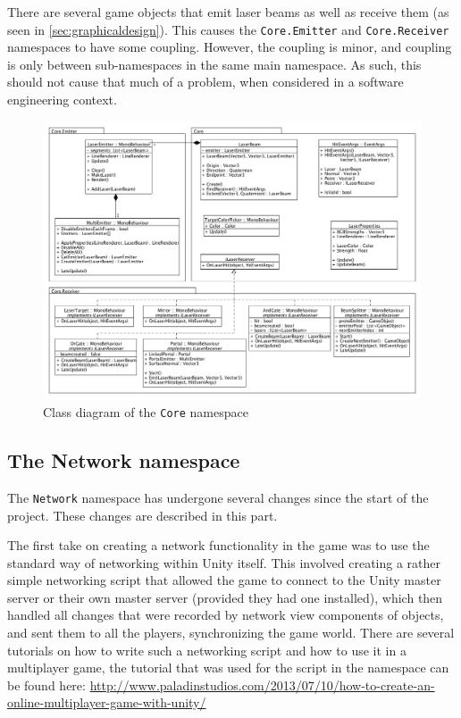 			There are several game objects that emit laser beams as well as 
			receive them (as seen in \ref{sec:graphicaldesign}). This causes the
			\texttt{Core.Emitter} and \texttt{Core.Receiver} namespaces to have 
			some coupling. However, the coupling is minor, and coupling is only 
			between sub-namespaces in the same main namespace. As such, this 
			should not cause that much of a problem, when considered in a 
			software engineering context.
			
			\begin{figure}[ht]
				\includegraphics[width=\textwidth]{ClassDiagramCore}
				\caption{Class diagram of the \texttt{Core} namespace}
				\label{fig:classdiagramcore}
			\end{figure}
			
		\subsection{The Network namespace} \label{ssec:networknamespace}
			The \texttt{Network} namespace has undergone several changes since the start
			of the project. These changes are described in this part.
			
			The first take on creating a network functionality in the game
			was to use the standard way of networking within Unity itself.
			This involved creating a rather simple networking script that
			allowed the game to connect to the Unity master server or their own
			master server (provided they had one installed), which then handled
			all changes that were recorded by network view components of objects,
			and sent them to all the players, synchronizing the game world.
			There are several tutorials on how to write such a networking
			script and how to use it in a multiplayer game, the tutorial that
			was used for the script in the namespace can be found here:
			\url{http://www.paladinstudios.com/2013/07/10/how-to-create-an-online-multiplayer-game-with-unity/}
			
